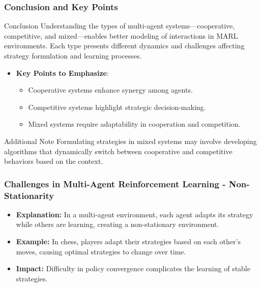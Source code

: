 \documentclass[aspectratio=169]{beamer}
\begin{document}
\begin{frame}[fragile]
    \frametitle{Conclusion and Key Points}
    \begin{block}{Conclusion}
        Understanding the types of multi-agent systems—cooperative, competitive, and mixed—enables better modeling of interactions in MARL environments. Each type presents different dynamics and challenges affecting strategy formulation and learning processes.
    \end{block}

    \begin{itemize}
        \item \textbf{Key Points to Emphasize}:
            \begin{itemize}
                \item Cooperative systems enhance synergy among agents.
                \item Competitive systems highlight strategic decision-making.
                \item Mixed systems require adaptability in cooperation and competition.
            \end{itemize}
    \end{itemize}
    
    \begin{block}{Additional Note}
        Formulating strategies in mixed systems may involve developing algorithms that dynamically switch between cooperative and competitive behaviors based on the context.
    \end{block}
\end{frame}

\begin{frame}[fragile]
    \frametitle{Challenges in Multi-Agent Reinforcement Learning - Non-Stationarity}
    \begin{itemize}
        \item \textbf{Explanation:} In a multi-agent environment, each agent adapts its strategy while others are learning, creating a non-stationary environment.
        \item \textbf{Example:} In chess, players adapt their strategies based on each other's moves, causing optimal strategies to change over time.
        \item \textbf{Impact:} Difficulty in policy convergence complicates the learning of stable strategies.
    \end{itemize}
\end{frame}
\end{document}
